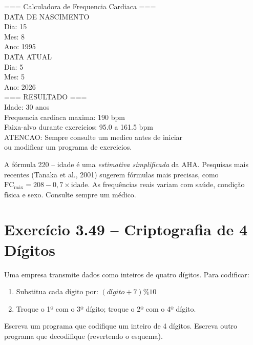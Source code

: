 \documentclass[12pt,a4paper]{article}
\begin{document}
\begin{respostabox}
\begin{saida}
=== Calculadora de Frequencia Cardiaca ===\\[2pt]
DATA DE NASCIMENTO\\
Dia: 15\\Mes: 8\\Ano: 1995\\[2pt]
DATA ATUAL\\
Dia: 5\\Mes: 5\\Ano: 2026\\[2pt]
=== RESULTADO ===\\
Idade: 30 anos\\
Frequencia cardiaca maxima: 190 bpm\\
Faixa-alvo durante exercicios: 95.0 a 161.5 bpm\\[2pt]
ATENCAO: Sempre consulte um medico antes de iniciar\\
\hphantom{ATENCAO:} ou modificar um programa de exercicios.
\end{saida}
\end{respostabox}

\begin{atencao}
A fórmula 220 -- idade é uma \textit{estimativa simplificada} da AHA. Pesquisas
mais recentes (Tanaka et al., 2001) sugerem fórmulas mais precisas, como
$\text{FC}_\text{máx} = 208 - 0{,}7 \times \text{idade}$. As frequências reais
variam com saúde, condição física e sexo. Consulte sempre um médico.
\end{atencao}

\newpage

\section{Exercício 3.49 -- Criptografia de 4 Dígitos}

\begin{enunciadoBox}[Enunciado 3.49]
Uma empresa transmite dados como inteiros de quatro dígitos. Para codificar:
\begin{enumerate}[noitemsep]
  \item Substitua cada dígito por: \((dígito + 7) \% 10\)
  \item Troque o 1º com o 3º dígito; troque o 2º com o 4º dígito.
\end{enumerate}
Escreva um programa que codifique um inteiro de 4 dígitos. Escreva outro programa
que decodifique (revertendo o esquema).
\end{enunciadoBox}
\end{document}
